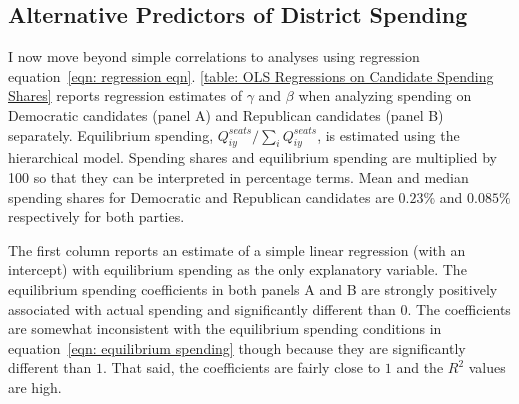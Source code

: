 \documentclass[12pt,final,fleqn]{article}
\theoremstyle{plain}
\begin{document}
\subsection{Alternative Predictors of District Spending}
I now move beyond simple correlations to analyses using regression equation~\ref{eqn: regression eqn}. \autoref{table: OLS Regressions on Candidate Spending Shares} reports regression estimates of $\gamma$ and $\beta$ when analyzing spending on Democratic candidates (panel A) and Republican candidates (panel B) separately. Equilibrium spending, $Q_{iy}^{seats}/ \sum_i Q_{iy}^{seats}$, is estimated using the hierarchical model. Spending shares and equilibrium spending are multiplied by 100 so that they can be interpreted in percentage terms. Mean and median spending shares for Democratic and Republican candidates are $0.23\%$ and $0.085\%$ respectively for both parties.

The first column reports an estimate of a simple linear regression (with an intercept) with equilibrium spending as the only explanatory variable. The equilibrium spending coefficients in both panels A and B are strongly positively associated with actual spending and significantly different than $0$. The coefficients are somewhat inconsistent with the equilibrium spending conditions in equation~\ref{eqn: equilibrium spending} though because they are significantly different than $1$. That said, the coefficients are fairly close to $1$ and the $R^2$ values are high.
\end{document}
